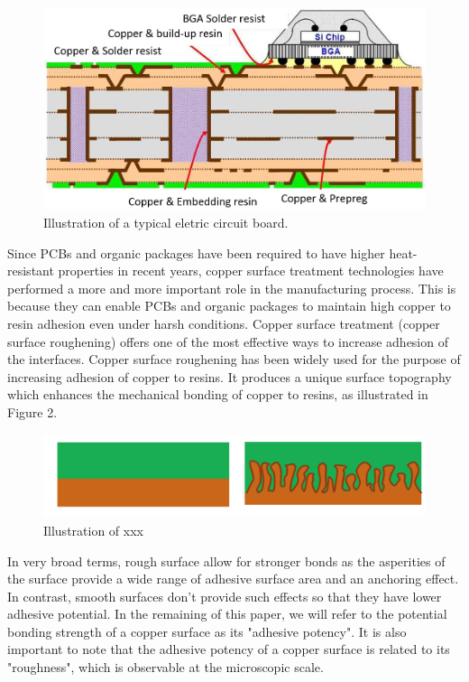 \documentclass[10pt,twocolumn,letterpaper]{article}
\begin{document}
\begin{figure}[h]
\centering
\includegraphics[width=0.9\linewidth]{"./figures/Figure1"}
\caption{
Illustration of a typical eletric circuit board.
}
\end{figure}


Since PCBs and organic packages have been required to have higher heat-resistant properties in recent years, copper surface treatment technologies have performed a more and more important role in the manufacturing process. This is because they can enable PCBs and organic packages to maintain high copper to resin adhesion even under harsh conditions. Copper surface treatment (copper surface roughening) offers one of the most effective ways to increase adhesion of the interfaces. Copper surface roughening has been widely used for the purpose of increasing adhesion of copper to resins. It produces a unique surface topography which enhances the mechanical bonding of copper to resins, as illustrated in Figure 2.


\begin{figure}[h]
	\centering
	\includegraphics[width=0.9\linewidth]{"./figures/Figure2"}
	\caption{
		Illustration of xxx
	}
\end{figure}

In very broad terms, rough surface allow for stronger bonds as the asperities of the surface provide a wide range of adhesive surface area and an anchoring effect. In contrast, smooth surfaces don’t provide such effects so that they have lower adhesive potential. 
In the remaining of this paper, we will refer to the potential bonding strength of a copper surface as its "adhesive potency".
It is also important to note that the adhesive potency of a copper surface is related to its "roughness", which is observable at the microscopic scale.
\end{document}
